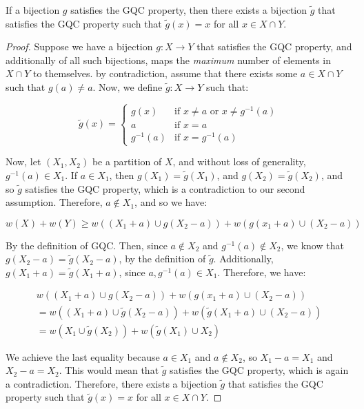 \begin{lemma}
    If a bijection $g$ satisfies the GQC property, then there exists a bijection $\tilde{g}$ that satisfies the GQC property such that $\tilde{g}(x) = x$ for all $x \in X \cap Y$.
\end{lemma}
\begin{proof}
    Suppose we have a bijection $g: X \rightarrow Y$ that satisfies the GQC property, and additionally of all such bijections, maps the \textit{maximum} number of elements in $X \cap Y$ to themselves. by contradiction, assume that there exists some $a \in X \cap Y$ such that $g(a) \neq a$. Now, we define $\tilde{g}: X \rightarrow Y$ such that:
    
    \begin{equation*}
        \tilde{g}(x) = \begin{cases}
            g(x) & \text{if } x \neq a \text{ or } x \neq g^{-1}(a) \\
            a & \text{if } x = a \\
            g^{-1}(a) & \text{if } x = g^{-1}(a)
        \end{cases}
    \end{equation*}
    
    Now, let $(X_1, X_2)$ be a partition of $X$, and without loss of generality, $g^{-1}(a) \in X_1$. If $a \in X_1$, then $g(X_1) = \tilde{g}(X_1)$, and $g(X_2) = \tilde{g}(X_2)$, and so $\tilde{g}$ satisfies the GQC property, which is a contradiction to our second assumption. Therefore, $a \not\in X_1$, and so we have:

    \begin{equation*}
        w(X) + w(Y) \geq w((X_1+a) \cup g(X_2-a)) + w(g(x_1+a) \cup (X_2-a))
    \end{equation*}

    By the definition of GQC. Then, since $a\not \in X_2$ and $g^{-1}(a) \not \in X_2$, we know that $g(X_2-a) = \tilde{g}(X_2-a)$, by the definition of $\tilde{g}$. Additionally, $g(X_1+a) = \tilde{g}(X_1+a)$, since $a, g^{-1}(a) \in X_1$. Therefore, we have: 
    
    \begin{equation*}
        \begin{gathered}
            w((X_1+a) \cup g(X_2-a)) + w(g(x_1+a) \cup (X_2-a)) \\
            = w((X_1+a) \cup \tilde{g}(X_2-a)) + w(\tilde{g}(X_1+a) \cup (X_2-a)) \\ 
            = w(X_1 \cup \tilde{g}(X_2)) + w(\tilde{g}(X_1) \cup X_2)
        \end{gathered}
    \end{equation*}

    We achieve the last equality because $a \in X_1$ and $a \not\in X_2$, so $X_1 - a = X_1$ and $X_2 - a = X_2$. This would mean that $\tilde{g}$ satisfies the GQC property, which is again a contradiction. Therefore, there exists a bijection $\tilde{g}$ that satisfies the GQC property such that $\tilde{g}(x) = x$ for all $x \in X \cap Y$.
\end{proof}

